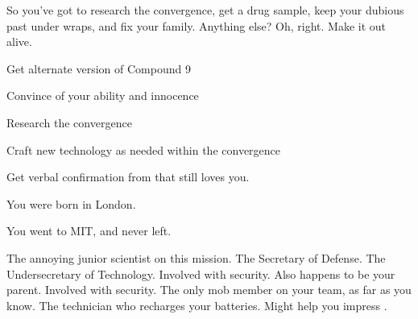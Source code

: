 \documentclass[char]{guildcamp3}
\begin{document}
So you've got to research the convergence, get a drug sample, keep your dubious past under wraps, and fix your family. Anything else? Oh, right. Make it out alive.

\begin{itemz}[Goals]
  \item Get alternate version of Compound 9
  \item Convince \cSciOne{} of your ability and innocence
  \item Research the convergence
  \item Craft new technology as needed within the convergence
  \item Get verbal confirmation from \cSpecOpOne{} that \cSpecOpOne{\they} still loves you.
\end{itemz}

\begin{itemz}[Notes]
  \item You were born in London.
  \item You went to MIT, and never left.
\end{itemz}


\begin{contacts}
  \contact{\cSciTwo{}} The annoying junior scientist on this mission.
  \contact{\cPoliOne{}} The Secretary of Defense.
  \contact{\cPoliTwo{}} The Undersecretary of Technology.
  \contact{\cSpecOpOne{}} Involved with security. Also happens to be your parent.
  \contact{\cSpecOpTwo{}} Involved with security. The only mob member on your team, as far as you know.
  \contact{\cTech{}} The technician who recharges your batteries. Might help you impress \cSciTwo{}.
\end{contacts}



  \mTest{}



\end{document}
